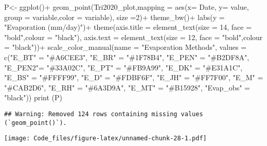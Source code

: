 \documentclass[
]{article}
\newenvironment{Shaded}{\begin{snugshade}}{\end{snugshade}}
\newcommand{\AttributeTok}[1]{\textcolor[rgb]{0.77,0.63,0.00}{#1}}
\newcommand{\DecValTok}[1]{\textcolor[rgb]{0.00,0.00,0.81}{#1}}
\newcommand{\FunctionTok}[1]{\textcolor[rgb]{0.00,0.00,0.00}{#1}}
\newcommand{\NormalTok}[1]{#1}
\newcommand{\OtherTok}[1]{\textcolor[rgb]{0.56,0.35,0.01}{#1}}
\newcommand{\SpecialCharTok}[1]{\textcolor[rgb]{0.00,0.00,0.00}{#1}}
\newcommand{\StringTok}[1]{\textcolor[rgb]{0.31,0.60,0.02}{#1}}
\begin{document}
\begin{Shaded}
\begin{Highlighting}[]
\NormalTok{P}\OtherTok{\textless{}{-}} \FunctionTok{ggplot}\NormalTok{()}\SpecialCharTok{+}
  \FunctionTok{geom\_point}\NormalTok{(Tri2020\_plot,}\AttributeTok{mapping =} \FunctionTok{aes}\NormalTok{(}\AttributeTok{x=}\NormalTok{ Date, }\AttributeTok{y=}\NormalTok{ value,  }\AttributeTok{group =}\NormalTok{ variable,}\AttributeTok{color =}\NormalTok{ variable), }\AttributeTok{size =}\DecValTok{2}\NormalTok{)}\SpecialCharTok{+}
  \FunctionTok{theme\_bw}\NormalTok{()}\SpecialCharTok{+}
  \FunctionTok{labs}\NormalTok{(}\AttributeTok{y =} \StringTok{"Evaporation (mm/day)"}\NormalTok{)}\SpecialCharTok{+}
  \FunctionTok{theme}\NormalTok{(}\AttributeTok{axis.title =} \FunctionTok{element\_text}\NormalTok{(}\AttributeTok{size =} \DecValTok{14}\NormalTok{, }\AttributeTok{face =} \StringTok{"bold"}\NormalTok{,}\AttributeTok{colour =} \StringTok{"black"}\NormalTok{),}
        \AttributeTok{axis.text  =} \FunctionTok{element\_text}\NormalTok{(}\AttributeTok{size =} \DecValTok{12}\NormalTok{, }\AttributeTok{face =} \StringTok{"bold"}\NormalTok{,}\AttributeTok{colour =} \StringTok{"black"}\NormalTok{))}\SpecialCharTok{+}
  \FunctionTok{scale\_color\_manual}\NormalTok{(}\AttributeTok{name =} \StringTok{"Evaporation Methods"}\NormalTok{,}
                     \AttributeTok{values =} \FunctionTok{c}\NormalTok{(}\StringTok{"E\_BT"} \OtherTok{=} \StringTok{"\#A6CEE3"}\NormalTok{,}
                                \StringTok{"E\_BR"} \OtherTok{=} \StringTok{"\#1F78B4"}\NormalTok{,}
                                \StringTok{"E\_PEN"} \OtherTok{=} \StringTok{"\#B2DF8A"}\NormalTok{,}
                                \StringTok{"E\_PEN2"}\OtherTok{=} \StringTok{"\#33A02C"}\NormalTok{,}
                                \StringTok{"E\_PT"} \OtherTok{=} \StringTok{"\#FB9A99"}\NormalTok{,}
                                \StringTok{"E\_DK"} \OtherTok{=} \StringTok{"\#E31A1C"}\NormalTok{,}
                                \StringTok{"E\_BS"} \OtherTok{=} \StringTok{"\#FFFF99"}\NormalTok{,}
                                 \StringTok{"E\_D"} \OtherTok{=} \StringTok{"\#FDBF6F"}\NormalTok{,                     }
                                \StringTok{"E\_JH"} \OtherTok{=} \StringTok{"\#FF7F00"}\NormalTok{,  }
                               \StringTok{"E\_M"} \OtherTok{=} \StringTok{"\#CAB2D6"}\NormalTok{,}
                               \StringTok{"E\_RH"} \OtherTok{=} \StringTok{"\#6A3D9A"}\NormalTok{,                     }
                                \StringTok{"E\_MT"} \OtherTok{=} \StringTok{"\#B15928"}\NormalTok{,}
                               \StringTok{"Evap\_obs"} \OtherTok{=} \StringTok{"black"}\NormalTok{))}
\FunctionTok{print}\NormalTok{ (P)}
\end{Highlighting}
\end{Shaded}

\begin{verbatim}
## Warning: Removed 124 rows containing missing values (`geom_point()`).
\end{verbatim}

\texttt{[image: Code\_files/figure-latex/unnamed-chunk-28-1.pdf]}
\end{document}
